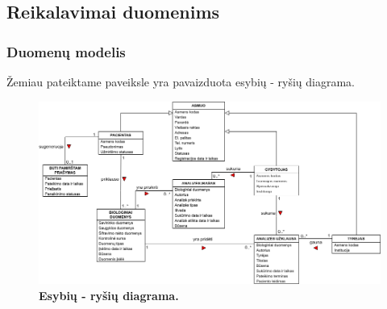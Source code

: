 \documentclass[12pt]{article}
\begin{document}
\newpage

\subsection{Reikalavimai duomenims}
\subsubsection{Duomenų modelis}
Žemiau pateiktame paveiksle yra pavaizduota esybių - ryšių diagrama.

\begin{figure}[ht]
    \begin{center}
        \captionsetup{justification=centering}
        \includegraphics[width=1.05\linewidth]{ER.png}
        \vspace{-1\baselineskip}
        \caption{\small\textbf{Esybių - ryšių diagrama.}}
        \label{fig:image3}
    \end{center}
\end{figure}

\newpage
\end{document}
